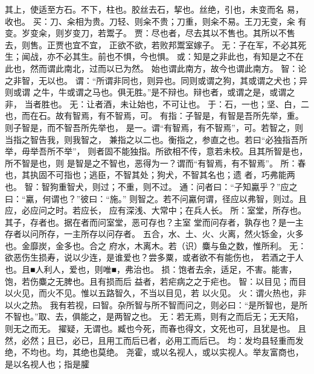 \documentclass[12pt,UTF8]{ctexbook}
\begin{document}
其上，使适至方石。不下，柱也。胶丝去石，挈也。丝绝，引也，未变而名 
易，收也。 
买：刀、籴相为贵。刀轻、则籴不贵；刀重，则籴不易。王刀无变，籴 
有变。岁变籴，则岁变刀，若鬻子。 
贾：尽也者，尽去其以不售也。其所以不售去，则售。正贾也宜不宜， 
正欲不欲，若败邦鬻室嫁子。 
无：子在军，不必其死生；闻战，亦不必其生。前也不惧，今也惧。 
或：知是之非此也，有知是之不在此也，然而谓此南北，过而以已为然。 
始也谓此南方，故今也谓此南方。 
智：论之非智，无以也。 
谓：“所谓非同也，则异也。同则或谓之狗，其或谓之犬也；异则或谓 
之牛，牛或谓之马也。俱无胜。”是不辩也。辩也者，或谓之是，或谓之非， 
当者胜也。 
无：让者酒，未让始也，不可让也。 
于：石，一也；坚、白，二也，而在石。故有智焉，有不智焉，可。 
有指：子智是，有智是吾所先举，重。则子智是，而不智吾所先举也， 
是一。谓“有智焉，有不智焉”，可。若智之，则当指之智告我，则我智之， 
兼指之以二也。衡指之，参直之也。若曰“必独指吾所举，毋举吾所不举”， 
则者固不能独指。所欲相不传，意若未校。且其所智是也，所不智是也，则 
是智是之不智也，恶得为一？谓而“有智焉，有不智焉”。 
所：春也，其执固不可指也；逃臣，不智其处；狗犬，不智其名也；遗 
者，巧弗能两也。 
智：智狗重智犬，则过；不重，则不过。 
通：问者曰：“子知驘乎？”应之曰：“驘，何谓也？”彼曰：“施。” 
则智之。若不问驘何谓，径应以弗智，则过。且应，必应问之时。若应长， 
应有深浅、大常中；在兵人长。 
所：室堂，所存也。其子，存者也。据在者而问室堂，恶可存也？主室 
堂而问存者，孰存也？是一主存者以问所存，一主所存以问存者。 
五合，水、土、火、火离，然火铄金，火多也。金靡炭，金多也。合之 
府水，木离木。若（识）麋与鱼之数，惟所利。 
无：欲恶伤生损寿，说以少连，是谁爱也？尝多粟，或者欲不有能伤也， 
若酒之于人也。且■人利人，爱也，则唯■，弗治也。 
损：饱者去余，适足，不害。能害，饱，若伤麋之无脾也。且有损而后 
益者，若疟病之之于疟也。 
智：以目见；而目以火见，而火不见。惟以五路智久，不当以目见，若 
以火见。 
火：谓火热也，非以火之热。 
我有若视，曰智。杂所智与所不智而问之，则必曰：“是所智也，是所 
不智也。”取、去，俱能之，是两智之也。 
无：若无焉，则有之而后无；无天陷，则无之而无。 
擢疑，无谓也。臧也今死，而春也得文，文死也可，且犹是也。 
且然，必然；且已，必已，且用工而后已者，必用工而后已。 
均：发均县轻重而发绝，不均也。均，其绝也莫绝。 
尧霍，或以名视人，或以实视人。举友富商也，是以名视人也；指是臛 
\end{document}
